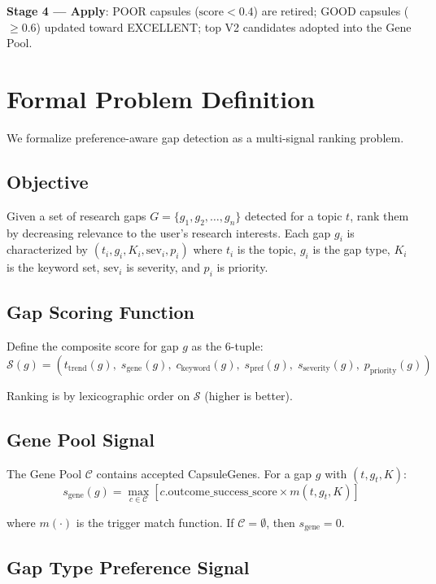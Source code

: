 \documentclass[anon,9pt]{article}
\begin{document}
\textbf{Stage 4 --- Apply}: POOR capsules ($\text{score} < 0.4$) are retired; GOOD capsules ($\geq 0.6$) updated toward EXCELLENT; top V2 candidates adopted into the Gene Pool.

\section{Formal Problem Definition}

We formalize preference-aware gap detection as a multi-signal ranking problem.

\subsection{Objective}

Given a set of research gaps $G = \{g_1, g_2, \ldots, g_n\}$ detected for a topic $t$, rank them by decreasing relevance to the user's research interests. Each gap $g_i$ is characterized by $(t_i, g_i, K_i, \text{sev}_i, p_i)$ where $t_i$ is the topic, $g_i$ is the gap type, $K_i$ is the keyword set, $\text{sev}_i$ is severity, and $p_i$ is priority.

\subsection{Gap Scoring Function}

Define the composite score for gap $g$ as the 6-tuple:
$$\mathcal{S}(g) = (t_{\text{trend}}(g),\; s_{\text{gene}}(g),\; c_{\text{keyword}}(g),\; s_{\text{pref}}(g),\; s_{\text{severity}}(g),\; p_{\text{priority}}(g))$$

Ranking is by lexicographic order on $\mathcal{S}$ (higher is better).

\subsection{Gene Pool Signal}

The Gene Pool $\mathcal{C}$ contains accepted CapsuleGenes. For a gap $g$ with $(t, g_t, K)$:
$$s_{\text{gene}}(g) = \max_{c \in \mathcal{C}} \left[ c.\text{outcome\_success\_score} \times m(t, g_t, K) \right]$$

where $m(\cdot)$ is the trigger match function. If $\mathcal{C} = \emptyset$, then $s_{\text{gene}} = 0$.

\subsection{Gap Type Preference Signal}
\end{document}
